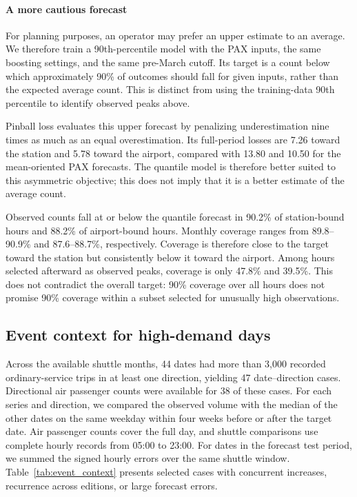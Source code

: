 \documentclass[preprint,12pt,times]{elsarticle}
\begin{document}
\paragraph{A more cautious forecast}
For planning purposes, an operator may prefer an upper estimate to an average. We therefore train a 90th-percentile model with the PAX inputs, the same boosting settings, and the same pre-March cutoff. Its target is a count below which approximately 90\% of outcomes should fall for given inputs, rather than the expected average count. This is distinct from using the training-data 90th percentile to identify observed peaks above.

Pinball loss evaluates this upper forecast by penalizing underestimation nine times as much as an equal overestimation. Its full-period losses are 7.26 toward the station and 5.78 toward the airport, compared with 13.80 and 10.50 for the mean-oriented PAX forecasts. The quantile model is therefore better suited to this asymmetric objective; this does not imply that it is a better estimate of the average count.

Observed counts fall at or below the quantile forecast in 90.2\% of station-bound hours and 88.2\% of airport-bound hours. Monthly coverage ranges from 89.8--90.9\% and 87.6--88.7\%, respectively. Coverage is therefore close to the target toward the station but consistently below it toward the airport. Among hours selected afterward as observed peaks, coverage is only 47.8\% and 39.5\%. This does not contradict the overall target: 90\% coverage over all hours does not promise 90\% coverage within a subset selected for unusually high observations.

\subsection{Event context for high-demand days}
\label{sec:event_context}
Across the available shuttle months, 44 dates had more than 3,000 recorded ordinary-service trips in at least one direction, yielding 47 date--direction cases. Directional air passenger counts were available for 38 of these cases. For each series and direction, we compared the observed volume with the median of the other dates on the same weekday within four weeks before or after the target date. Air passenger counts cover the full day, and shuttle comparisons use complete hourly records from 05:00 to 23:00. For dates in the forecast test period, we summed the signed hourly errors over the same shuttle window. Table~\ref{tab:event_context} presents selected cases with concurrent increases, recurrence across editions, or large forecast errors.
\end{document}
